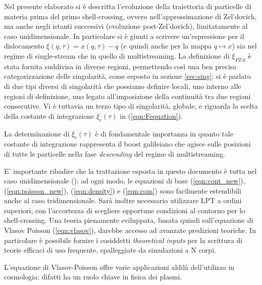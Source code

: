 Nel presente elaborato si è descritta l'evoluzione della traiettoria di 
particelle di materia prima del primo shell-crossing, ovvero nell'approssimazione di
Zel'dovich, ma anche negli istanti successivi (evoluzione post-Zel'dovich), limitatamente al caso unidimensionale. 
In particolare si è giunti a scrivere un'espressione per il dislocamento $\xi(q, \tau) = x(q,\tau)-q$
(e quindi anche per la mappa $q\mapsto x$) sia nel regime di single-stream che in quello di multistreaming.
La definizione di $\xi_{PZA}$ è stata fornita suddivisa in diverse regioni, permettendo così 
una ben precisa categorizzazione delle singolarità, come esposto in sezione \ref{sec:sing}: si è 
parlato di due tipi diversi di singolarità che possiamo definire locali, uno interno alle 
regioni di definizione, uno legato all'imposizione della continuità tra due regioni consecutive.
Vi è tuttavia un terzo tipo di singolarità, globale, e riguarda la scelta della
costante di integrazione $\xi_c(\tau)$ in (\ref{eqn:Fequation}).

\begin{comment}
    qui non ben chiaro cosa si intende per spatial average, e che tipo di singolarità è la terza
\end{comment}

La determinazione di $\xi_c(\tau)$ è di fondamentale importanza in quanto tale costante 
di integrazione rappresenta il boost galileiano che agisce sulle posizioni di tutte le 
particelle nella fase \textit{descending} del regime di multistreaming.

E' importante ribadire che la trattazione esposta in questo documento
è tutta nel caso unidimensionale (\cite{rampf}): ad ogni modo, le equazioni di base (\ref{eqn:cont_new}),
(\ref{eqn:poisson_new}), (\ref{eqn:density}) e (\ref{eqn:com}) sono facilmente estendibili
anche al caso tridimensionale. Sarà inoltre necessario utilizzare LPT a ordini superiori,
con l'accortezza di scegliere opportune condizioni al contorno per lo shell-crossing.
Una teoria pienamente sviluppata, basata quindi sull'equazione di Vlasov Poisson 
(\ref{eqn:vlasov}), darebbe accesso ad avanzate predizioni teoriche. In particolare è possibile
fornire i cosiddetti \textit{theoretical inputs} per la scrittura di teorie efficaci di uso 
frequente, spalleggiate da simulazioni a N corpi.

L'equazione di Vlasov-Poisson offre varie applicazioni aldilà dell'utilizzo in 
cosmologia: difatti ha un ruolo chiave in fisica dei plasmi.